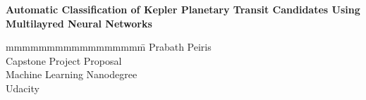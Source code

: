 \documentclass[a4paper,12pt]{report}
\begin{document}
\doublespacing

\begin{titlepage}
\vspace*{2cm}
\noindent
\begin{flushleft}
	\setlength{\baselineskip}{2\baselineskip}
	{{\Huge \bf Automatic Classification of Kepler Planetary Transit Candidates Using Multilayred Neural Networks}}
\end{flushleft}


\vspace{1cm}
\vspace{\fill}
\vspace{1.3cm}
\begin{tabbing}
mmmmmmmmmmmmmmmmm\= \kill
\>Prabath Peiris\\
\>Capstone Project Proposal\\
\>Machine Learning Nanodegree\\
\>Udacity\\
\> \\
\end{tabbing}
\end{titlepage}

\thispagestyle{empty}
\newlength{\origpar}
\setlength{\origpar}{\parindent}
\setlength{\parindent}{0pt}
%
\setlength{\parindent}{\origpar}
\thispagestyle{empty}
\tableofcontents
\clearpage

\renewcommand {\baselinestretch} {1.0}
\pagebreak










\end{document}
